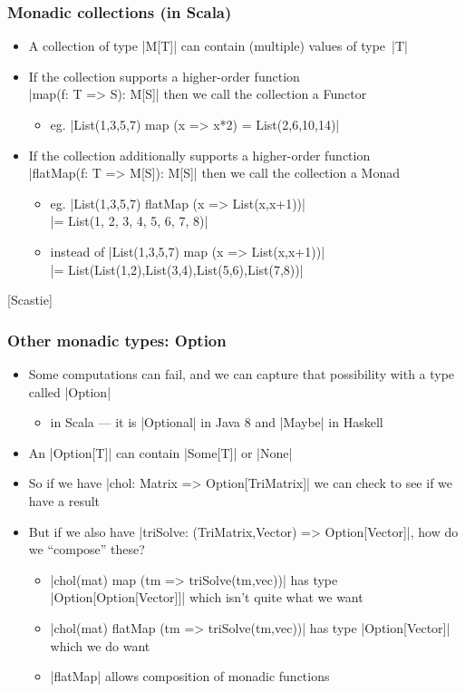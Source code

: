 \documentclass[mathserif,handout]{beamer}
\begin{document}
\begin{frame}[fragile]
  \frametitle{Monadic collections (in Scala)}
  \begin{itemize}
  \item A collection of type |M[T]| can contain (multiple) values of type~|T|
  \item If the collection supports a higher-order function\\
    |map(f: T => S): M[S]| then we call the collection a \alert{Functor}
    \begin{itemize}
    \item eg. |List(1,3,5,7) map (x => x*2) = List(2,6,10,14)|
    \end{itemize}
  \item If the collection additionally supports a higher-order function\\
    |flatMap(f: T => M[S]): M[S]| then we call the collection a \alert{Monad}
    \begin{itemize}
    \item eg. |List(1,3,5,7) flatMap (x => List(x,x+1))|\\
      \hspace{6ex} |= List(1, 2, 3, 4, 5, 6, 7, 8)|
    \item instead of |List(1,3,5,7) map (x => List(x,x+1))|\\
      |= List(List(1,2),List(3,4),List(5,6),List(7,8))|
    \end{itemize}
  \end{itemize}
  \mbox{}\hfill\alert{[Scastie]}
\end{frame}

  
\begin{frame}[fragile]
  \frametitle{Other monadic types: Option}
  \begin{itemize}
  \item Some computations can fail, and we can capture that possibility with a type called |Option|
    \begin{itemize}
    \item in Scala --- it is |Optional| in Java 8 and |Maybe| in Haskell
      \end{itemize}
    \item An |Option[T]| can contain |Some[T]| or |None|
    \item So if we have |chol: Matrix => Option[TriMatrix]| we can check to see if we have a result
    \item But if we also have |triSolve: (TriMatrix,Vector) => Option[Vector]|, how do we ``compose'' these?
      \begin{itemize}
      \item |chol(mat) map (tm => triSolve(tm,vec))| has type |Option[Option[Vector]]| which isn't quite what we want
      \item |chol(mat) flatMap (tm => triSolve(tm,vec))| has type |Option[Vector]| which we do want
        \item |flatMap| allows \alert{composition} of monadic functions
        \end{itemize}
    \end{itemize}
\end{frame}
\end{document}

